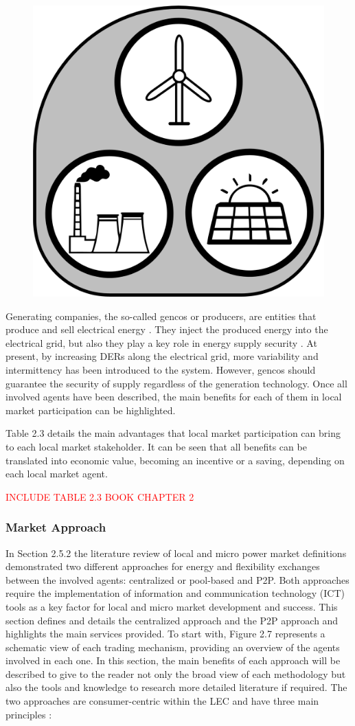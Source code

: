 \begin{figure}
	\centering
	\includegraphics[width=0.1\columnwidth ]{ChapterIntro/Figures/Gencos.jpg}
	\label{gencos}  
\end{figure}


Generating companies, the so-called gencos or producers, are entities that produce and sell electrical energy \cite{Kirschen2004}. They inject the produced energy into the electrical grid, but also they play a key role in energy supply security \cite{USEFFoundation2015a}. At present, by increasing DERs along the electrical grid, more variability and intermittency has been introduced to the system. However, gencos should guarantee the security of supply regardless of the generation technology. Once all involved agents have been described, the main benefits for each of them in local market participation can be highlighted. 

Table 2.3 details the main advantages that local market participation can bring to each local market stakeholder. It can be seen that all benefits can be translated into economic value, becoming an incentive or a saving, depending on each local market agent.

\textcolor{red}{INCLUDE TABLE 2.3 BOOK CHAPTER 2}

\subsubsection{Market Approach}

In Section 2.5.2 the literature review of local and micro power market definitions demonstrated two different
approaches for energy and flexibility exchanges between the involved agents: centralized or pool-based and
P2P. Both approaches require the implementation of information and communication technology (ICT) tools
as a key factor for local and micro market development and success. This section defines and details the
centralized approach and the P2P approach and highlights the main services provided. To start with, Figure 2.7
represents a schematic view of each trading mechanism, providing an overview of the agents involved in
each one. In this section, the main benefits of each approach will be described to give to the reader not only
the broad view of each methodology but also the tools and knowledge to research more detailed literature if
required. The two approaches are consumer-centric within the LEC and have three main principles \cite{sousa2018peer}:

